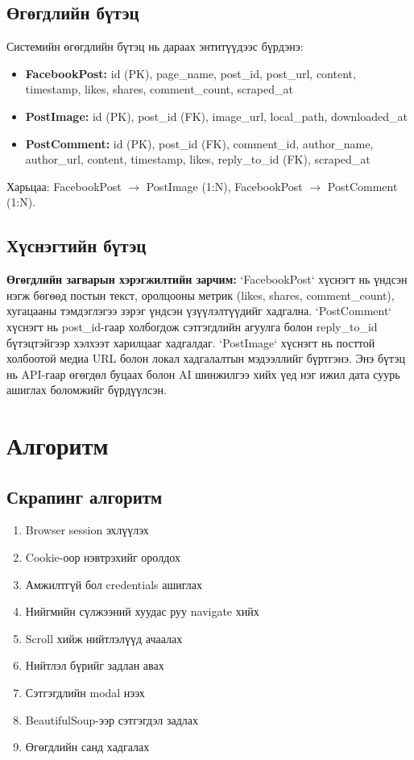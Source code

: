 \documentclass[12pt,a4paper]{report}
\begin{document}
\subsection{Өгөгдлийн бүтэц}

Системийн өгөгдлийн бүтэц нь дараах энтитүүдээс бүрдэнэ:

\begin{itemize}
    \item \textbf{FacebookPost:} id (PK), page\_name, post\_id, post\_url, content, timestamp, likes, shares, comment\_count, scraped\_at
    \item \textbf{PostImage:} id (PK), post\_id (FK), image\_url, local\_path, downloaded\_at
    \item \textbf{PostComment:} id (PK), post\_id (FK), comment\_id, author\_name, author\_url, content, timestamp, likes, reply\_to\_id (FK), scraped\_at
\end{itemize}

Харьцаа: FacebookPost $\rightarrow$ PostImage (1:N), FacebookPost $\rightarrow$ PostComment (1:N).

\subsection{Хүснэгтийн бүтэц}

\textbf{Өгөгдлийн загварын хэрэгжилтийн зарчим:} `FacebookPost` хүснэгт нь үндсэн нэгж бөгөөд постын текст, оролцооны метрик (likes, shares, comment\_count), хугацааны тэмдэглэгээ зэрэг үндсэн үзүүлэлтүүдийг хадгална. `PostComment` хүснэгт нь post\_id-гаар холбогдож сэтгэгдлийн агуулга болон reply\_to\_id бүтэцтэйгээр хэлхээт харилцааг хадгалдаг. `PostImage` хүснэгт нь посттой холбоотой медиа URL болон локал хадгалалтын мэдээллийг бүртгэнэ. Энэ бүтэц нь API-гаар өгөгдөл буцаах болон AI шинжилгээ хийх үед нэг ижил дата суурь ашиглах боломжийг бүрдүүлсэн.


\section{Алгоритм}

\subsection{Скрапинг алгоритм}

\begin{enumerate}
    \item Browser session эхлүүлэх
    \item Cookie-оор нэвтрэхийг оролдох
    \item Амжилтгүй бол credentials ашиглах
    \item Нийгмийн сүлжээний хуудас руу navigate хийх
    \item Scroll хийж нийтлэлүүд ачаалах
    \item Нийтлэл бүрийг задлан авах
    \item Сэтгэгдлийн modal нээх
    \item BeautifulSoup-ээр сэтгэгдэл задлах
    \item Өгөгдлийн санд хадгалах
\end{enumerate}
\end{document}
